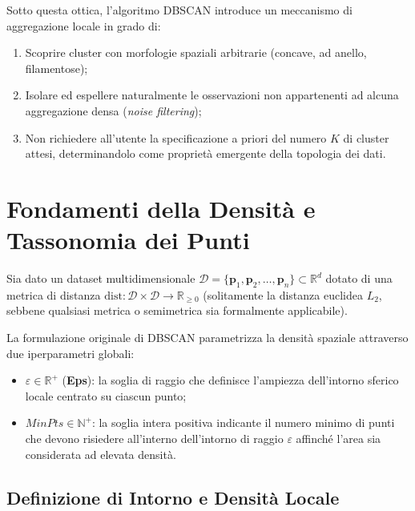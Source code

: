 Sotto questa ottica, l'algoritmo DBSCAN introduce un meccanismo di aggregazione locale in grado di:
\begin{enumerate}
    \item Scoprire cluster con morfologie spaziali arbitrarie (concave, ad anello, filamentose);
    \item Isolare ed espellere naturalmente le osservazioni non appartenenti ad alcuna aggregazione densa (\textit{noise filtering});
    \item Non richiedere all'utente la specificazione a priori del numero $K$ di cluster attesi, determinandolo come proprietà emergente della topologia dei dati.
\end{enumerate}

\section{Fondamenti della Densità e Tassonomia dei Punti}
\label{sec:dm-dbscan-density-taxonomy}

Sia dato un dataset multidimensionale $\mathcal{D} = \{\mathbf{p}_1, \mathbf{p}_2, \dots, \mathbf{p}_n\} \subset \mathbb{R}^d$ dotato di una metrica di distanza $\mathrm{dist}: \mathcal{D} \times \mathcal{D} \to \mathbb{R}_{\ge 0}$ (solitamente la distanza euclidea $L_2$, sebbene qualsiasi metrica o semimetrica sia formalmente applicabile).

La formulazione originale di DBSCAN parametrizza la densità spaziale attraverso due iperparametri globali:
\begin{itemize}
    \item $\varepsilon \in \mathbb{R}^+$ (\textbf{Eps}): la soglia di raggio che definisce l'ampiezza dell'intorno sferico locale centrato su ciascun punto;
    \item $MinPts \in \mathbb{N}^+$: la soglia intera positiva indicante il numero minimo di punti che devono risiedere all'interno dell'intorno di raggio $\varepsilon$ affinché l'area sia considerata ad elevata densità.
\end{itemize}

\subsection{Definizione di Intorno e Densità Locale}

